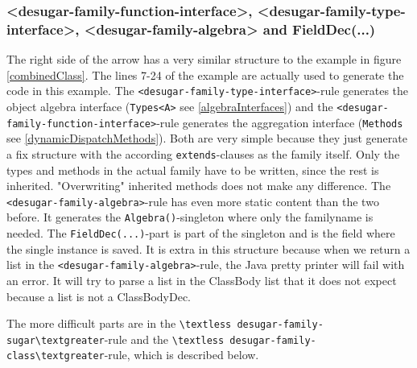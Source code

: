 \documentclass{report}
\begin{document}
\subsubsection{\textless desugar-family-function-interface\textgreater, \textless desugar-family-type-interface\textgreater, \textless desugar-family-algebra\textgreater{} and FieldDec(...)}

The right side of the arrow has a very similar structure to the example in figure \ref{combinedClass}. The lines 7-24 of the example are actually used to generate the code in this example. The \lstinline{<desugar-family-type-interface>}-rule generates the object algebra interface (\lstinline{Types<A>} see \ref{algebraInterfaces}) and the \lstinline{<desugar-family-function-interface>}-rule generates the aggregation interface (\lstinline{Methods} see \ref{dynamicDispatchMethods}). Both are very simple because they just generate a fix structure with the according \lstinline{extends}-clauses as the family itself. Only the types and methods in the actual family have to be written, since the rest is inherited. "Overwriting" inherited methods does not make any difference. The \lstinline{<desugar-family-algebra>}-rule has even more static content than the two before. It generates the \lstinline{Algebra()}-singleton where only the familyname is needed. The \lstinline{FieldDec(...)}-part is part of the singleton and is the field where the single instance is saved. It is extra in this structure because when we return a list in the \lstinline{<desugar-family-algebra>}-rule, the Java pretty printer will fail with an error. It will try to parse a list in the ClassBody list that it does not expect because a list is not a ClassBodyDec.

The more difficult parts are in the \lstinline{\textless desugar-family-sugar\textgreater}-rule and the \lstinline{\textless desugar-family-class\textgreater}-rule, which is described below.
\end{document}
